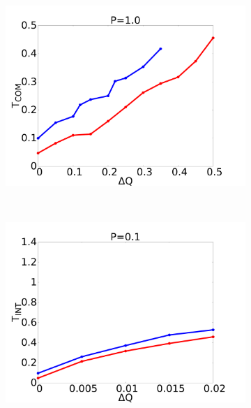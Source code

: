 \documentclass[handout]{beamer}
\begin{document}
\begin{frame}
\begin{figure}[h]
\begin{center}
\begin{subfigure}[t]{0.3\textwidth}
        \end{subfigure} 
        \
        \begin{subfigure}[t]{0.3\textwidth}
            \includegraphics[scale=0.09]{../images/p1_com.pdf}
        \end{subfigure} 
        \\
        \begin{subfigure}[t]{0.3\textwidth}
            \includegraphics[scale=0.09]{../images/p01_int.pdf}
        \end{subfigure} 
        \
        \begin{subfigure}[t]{0.3\textwidth}

\end{subfigure}
\end{center}
\end{figure}
\end{frame}
\end{document}
